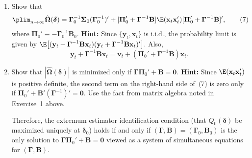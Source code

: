 \begin{problemset}
\begin{enumerate}[label=(\alph*)]
\item Show that
  \begin{equation}
    \plim_{n\to\infty} \hat{\boldsymbol{\Omega}}(\boldsymbol{\delta})
    = \boldsymbol{\Gamma}_0^{-1}\boldsymbol{\Sigma}_0(\boldsymbol{\Gamma}_0^{-1})'
    + [\boldsymbol{\Pi}_0' + \boldsymbol{\Gamma}^{-1}\mathbf{B}]
      \E(\mathbf{x}_t\mathbf{x}_t')
      [\boldsymbol{\Pi}_0' + \boldsymbol{\Gamma}^{-1}\mathbf{B}]',
    \tag{7}
  \end{equation}
  where $\boldsymbol{\Pi}_0' \equiv -\boldsymbol{\Gamma}_0^{-1}\mathbf{B}_0$.
  \textbf{Hint:} Since $\{\mathbf{y}_t, \mathbf{x}_t\}$ is i.i.d., the probability limit is
  given by
  $\E\bigl[(\mathbf{y}_t + \boldsymbol{\Gamma}^{-1}\mathbf{B}\mathbf{x}_t)
  (\mathbf{y}_t + \boldsymbol{\Gamma}^{-1}\mathbf{B}\mathbf{x}_t)'\bigr]$. Also,
  \[
    \mathbf{y}_t + \boldsymbol{\Gamma}^{-1}\mathbf{B}\mathbf{x}_t
    = \mathbf{v}_t + (\boldsymbol{\Pi}_0' + \boldsymbol{\Gamma}^{-1}\mathbf{B})\mathbf{x}_t.
  \]

\item Show that $|\hat{\boldsymbol{\Omega}}(\boldsymbol{\delta})|$ is minimized only if
  $\boldsymbol{\Gamma}\boldsymbol{\Pi}_0' + \mathbf{B} = \mathbf{0}$.
  \textbf{Hint:} Since $\E(\mathbf{x}_t\mathbf{x}_t')$
  is positive definite, the second term on the right-hand side of~(7) is zero only
  if $\boldsymbol{\Pi}_0' + \mathbf{B}'(\boldsymbol{\Gamma}^{-1})' = \mathbf{0}$. Use the fact from matrix algebra noted in Exercise~1
  above.

  Therefore, the extremum estimator identification condition (that $Q_0(\boldsymbol{\delta})$ be maximized uniquely at $\boldsymbol{\delta}_0$) holds if and only if $(\boldsymbol{\Gamma}, \mathbf{B}) = (\boldsymbol{\Gamma}_0, \mathbf{B}_0)$ is the only solution to $\boldsymbol{\Gamma}\boldsymbol{\Pi}_0' + \mathbf{B} = \mathbf{0}$ viewed as a system of simultaneous equations for $(\boldsymbol{\Gamma}, \mathbf{B})$.


\end{enumerate}
\end{problemset}
